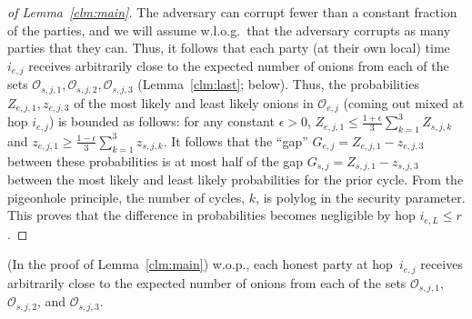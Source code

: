 \documentclass[runningheads,a4paper]{llncs}
\begin{document}
\begin{proof}[of Lemma~\ref{clm:main}]
The adversary can corrupt fewer than a constant fraction of the parties, and we will assume w.l.o.g.~that the adversary corrupts as many parties that they can. Thus, it follows that each party (at their own local) time $i_{e,j}$ receives arbitrarily close to the expected number of onions from each of the sets $\mathcal{O}_{s,j,1}, \mathcal{O}_{s,j,2}, \mathcal{O}_{s,j,3}$ (Lemma~\ref{clm:last}; below). 
Thus, the probabilities $Z_{e,j,1},z_{e,j,3}$ of the most likely and least likely onions in $\mathcal{O}_{e,j}$ (coming out mixed at hop $i_{e,j}$) is bounded as follows: for any constant $\epsilon>0$,
$Z_{e,j,1} \le \frac{1+\epsilon}{3} \sum_{k=1}^3 Z_{s,j,k}$ %
and 
$z_{e,j,1} \ge \frac{1-\epsilon}{3} \sum_{k=1}^3 z_{s,j,k}$. 
It follows that the ``gap'' $G_{e,j} = Z_{e,j,1}-z_{e,j,3}$ between these probabilities is at most half of the gap $G_{s,j} = Z_{s,j,1}-z_{s,j,3}$ between the most likely and least likely probabilities for the prior cycle. 
From the pigeonhole principle, the number of cycles, $k$, is polylog in the security parameter. This proves that the difference in probabilities becomes negligible by hop $i_{e,L} \le r$. 
\end{proof}

\begin{lemma} \label{clm:last}
(In the proof of Lemma~\ref{clm:main}) 
w.o.p., each honest party at hop~$i_{e,j}$ receives arbitrarily close to the expected number of onions from each of the sets $\mathcal{O}_{s,j,1}$, $\mathcal{O}_{s,j,2}$, and $\mathcal{O}_{s,j,3}$.
\end{lemma}
\end{document}
